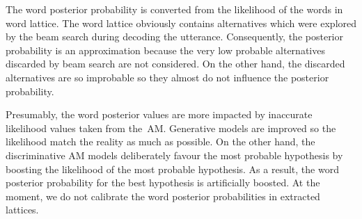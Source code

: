 
The word posterior probability is converted from the likelihood of the words in word lattice. 
The word lattice obviously contains alternatives which were explored by the beam search during decoding the utterance.
Consequently, the posterior probability is an approximation because the very low probable alternatives discarded by beam search are not considered.
On the other hand, the discarded alternatives are so improbable so they almost do not influence the posterior probability.

Presumably, the word posterior values are more impacted by inaccurate likelihood values taken from the~\acl{AM}.
Generative models are improved so the likelihood match the reality as much as possible.
On the other hand, the discriminative \ac{AM} models deliberately favour the most probable hypothesis by boosting the likelihood of the most probable hypothesis.
As a result, the word posterior probability for the best hypothesis is artificially boosted.
At the moment, we do not calibrate the word posterior probabilities in extracted lattices.

